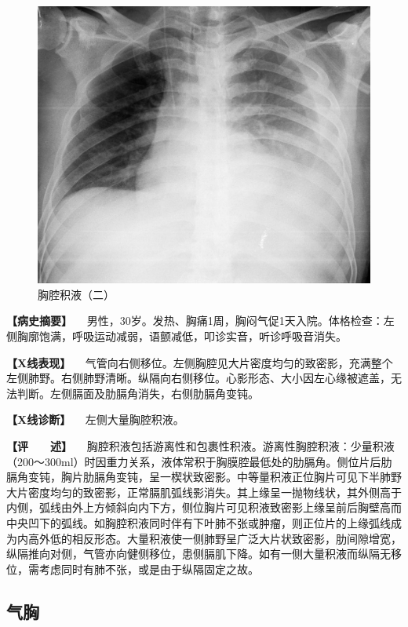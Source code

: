 \begin{figure}[!htbp]
 \centering
 \includegraphics{./images/Image00188.jpg}
 \captionsetup{justification=centering}
 \caption{胸腔积液（二）}
 \label{fig3-11-2}
  \end{figure} 

\textbf{【病史摘要】}
　男性，30岁。发热、胸痛1周，胸闷气促1天入院。体格检查：左侧胸廓饱满，呼吸运动减弱，语颤减低，叩诊实音，听诊呼吸音消失。

\textbf{【X线表现】}
　气管向右侧移位。左侧胸腔见大片密度均匀的致密影，充满整个左侧肺野。右侧肺野清晰。纵隔向右侧移位。心影形态、大小因左心缘被遮盖，无法判断。左侧膈面及肋膈角消失，右侧肋膈角变钝。

\textbf{【X线诊断】} 　左侧大量胸腔积液。

\textbf{【评　　述】}
　胸腔积液包括游离性和包裹性积液。游离性胸腔积液：少量积液（200～300ml）时因重力关系，液体常积于胸膜腔最低处的肋膈角。侧位片后肋膈角变钝，胸片肋膈角变钝，呈一楔状致密影。中等量积液正位胸片可见下半肺野大片密度均匀的致密影，正常膈肌弧线影消失。其上缘呈一抛物线状，其外侧高于内侧，弧线由外上方倾斜向内下方，侧位胸片可见积液致密影上缘呈前后胸壁高而中央凹下的弧线。如胸腔积液同时伴有下叶肺不张或肿瘤，则正位片的上缘弧线成为内高外低的相反形态。大量积液使一侧肺野呈广泛大片状致密影，肋间隙增宽，纵隔推向对侧，气管亦向健侧移位，患侧膈肌下降。如有一侧大量积液而纵隔无移位，需考虑同时有肺不张，或是由于纵隔固定之故。

\subsection{气胸}


